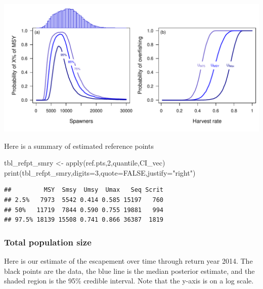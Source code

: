 \documentclass[
  11pt,
]{article}
\newenvironment{Shaded}{}{}
\newcommand{\DataTypeTok}[1]{#1}
\newcommand{\DecValTok}[1]{#1}
\newcommand{\KeywordTok}[1]{\textcolor[rgb]{0.00,0.00,1.00}{#1}}
\newcommand{\NormalTok}[1]{#1}
\newcommand{\OperatorTok}[1]{#1}
\newcommand{\OtherTok}[1]{\textcolor[rgb]{1.00,0.25,0.00}{#1}}
\newcommand{\StringTok}[1]{\textcolor[rgb]{0.00,0.50,0.50}{#1}}
\begin{document}
\begin{Shaded}
\begin{Highlighting}[]
{{     \DataTypeTok{y=}\KeywordTok{par}\NormalTok{()}\OperatorTok{$}\NormalTok{usr[}\DecValTok{4}\NormalTok{]}\OperatorTok{-}\NormalTok{offSet}\OperatorTok{*}\KeywordTok{diff}\NormalTok{(}\KeywordTok{par}\NormalTok{()}\OperatorTok{$}\NormalTok{usr[}\DecValTok{3}\OperatorTok{:}\DecValTok{4}\NormalTok{]),}\StringTok{"(b)"}\NormalTok{)}
\end{Highlighting}
\end{Shaded}

\includegraphics{App_2_Summarize_results_Summer_Fall_Chinook_files/figure-latex/plot_ref_pts-1.pdf}

Here is a summary of estimated reference points

\begin{Shaded}
\begin{Highlighting}[]
\NormalTok{tbl_refpt_smry <-}\StringTok{ }\KeywordTok{apply}\NormalTok{(ref.pts,}\DecValTok{2}\NormalTok{,quantile,CI_vec)}
\KeywordTok{print}\NormalTok{(tbl_refpt_smry,}\DataTypeTok{digits=}\DecValTok{3}\NormalTok{,}\DataTypeTok{quote=}\OtherTok{FALSE}\NormalTok{,}\DataTypeTok{justify=}\StringTok{"right"}\NormalTok{)}
\end{Highlighting}
\end{Shaded}

\begin{verbatim}
##         MSY  Smsy  Umsy  Umax   Seq Scrit
## 2.5%   7973  5542 0.414 0.585 15197   760
## 50%   11719  7844 0.590 0.755 19881   994
## 97.5% 18139 15508 0.741 0.866 36387  1819
\end{verbatim}

\hypertarget{total-population-size}{%
\subsubsection{Total population size}\label{total-population-size}}

Here is our estimate of the escapement over time through return year
2014. The black points are the data, the blue line is the median
posterior estimate, and the shaded region is the 95\% credible interval.
Note that the y-axis is on a log scale.
\end{document}
